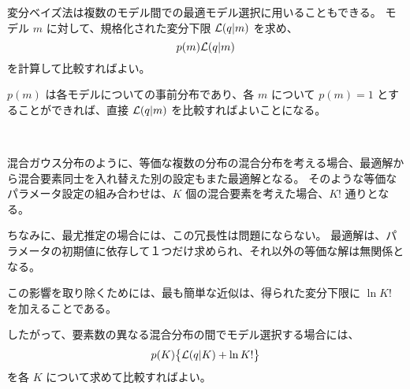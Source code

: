変分ベイズ法は複数のモデル間での最適モデル選択に用いることもできる。
モデル $m$ に対して、規格化された変分下限 ${\cal L}(q | m)$ を求め、
\begin{equation}
	p(m) {\cal L}(q | m)
\end{equation}
を計算して比較すればよい。

$p(m)$ は各モデルについての事前分布であり、各 $m$ について $p(m) = 1$ とすることができれば、直接 ${\cal L}(q | m)$ を比較すればよいことになる。

\

混合ガウス分布のように、等価な複数の分布の混合分布を考える場合、最適解から混合要素同士を入れ替えた別の設定もまた最適解となる。
そのような等価なパラメータ設定の組み合わせは、$K$ 個の混合要素を考えた場合、$K!$ 通りとなる。

ちなみに、最尤推定の場合には、この冗長性は問題にならない。
最適解は、パラメータの初期値に依存して１つだけ求められ、それ以外の等価な解は無関係となる。

この影響を取り除くためには、最も簡単な近似は、得られた変分下限に $\ln K!$ を加えることである。

したがって、要素数の異なる混合分布の間でモデル選択する場合には、
\begin{equation}
	p(K) \bigl\{ {\cal L}(q | K) + \ln K! \bigr\}
\end{equation}
を各 $K$ について求めて比較すればよい。

